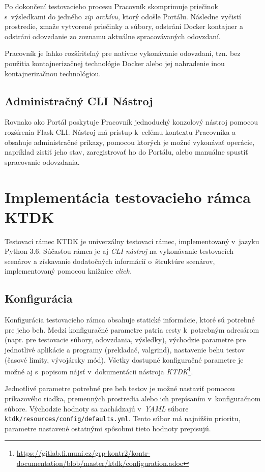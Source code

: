 \documentclass[
  digital, %
  oneside, %
  table,   %
  lof,     %
  lot,   %
]{fithesis3}
\begin{document}
Po dokončení testovacieho procesu Pracovník skomprimuje priečinok s~výsledkami do jedného \emph{zip archívu}, ktorý odošle Portálu. Následne vyčistí prostredie, zmaže vytvorené priečinky a súbory, odstráni Docker kontajner a odstráni odovzdanie zo zoznamu aktuálne spracovávaných odovzdaní.

Pracovník je ľahko rozšíriteľný pre natívne vykonávanie odovzdaní, tzn. bez použitia kontajnerizačnej technológie Docker alebo jej nahradenie inou kontajnerizačnou technológiou.

\subsection{Administračný CLI Nástroj}

Rovnako ako Portál poskytuje Pracovník jednoduchý konzolový nástroj pomocou rozšírenia Flask CLI. Nástroj má prístup k~celému kontextu Pracovníka a obsahuje administračné príkazy, pomocou ktorých je možné vykonávať operácie, napríklad zistiť jeho stav, zaregistrovať ho do Portálu, alebo manuálne spustiť spracovanie odovzdania.

\section{Implementácia testovacieho rámca KTDK}

Testovací rámec KTDK je univerzálny testovací rámec, implementovaný v~jazyku Python 3.6. Súčasťou rámca je aj \emph{CLI nástroj} na vykonávanie testovacích scenárov a získavanie dodatočných informácií o~štruktúre scenárov, implementovaný pomocou knižnice \emph{click}.

\subsection{Konfigurácia}
Konfigurácia testovacieho rámca obsahuje statické informácie, ktoré sú potrebné pre jeho beh. Medzi konfiguračné parametre patria cesty k~potrebným adresárom (napr. pre testovacie súbory, odovzdania, výsledky), východzie parametre pre jednotlivé aplikácie a programy (prekladač, valgrind), nastavenie behu testov (časové limity, vývojársky mód). Všetky dostupné konfiguračné parametre je možné aj s~popisom nájsť v~dokumentácii nástroja \emph{KTDK}\footnote{\url{https://gitlab.fi.muni.cz/grp-kontr2/kontr-documentation/blob/master/ktdk/configuration.adoc}}.

Jednotlivé parametre potrebné pre beh testov je možné nastaviť pomocou príkazového riadka, premenných prostredia alebo ich prepísaním v~konfiguračnom súbore. Východzie hodnoty sa nachádzajú v~\emph{YAML} súbore \texttt{ktdk/resources/config/defaults.yml}. Tento súbor má najnižšiu prioritu, parametre nastavené ostatnými spôsobmi tieto hodnoty prepisujú.
\end{document}
